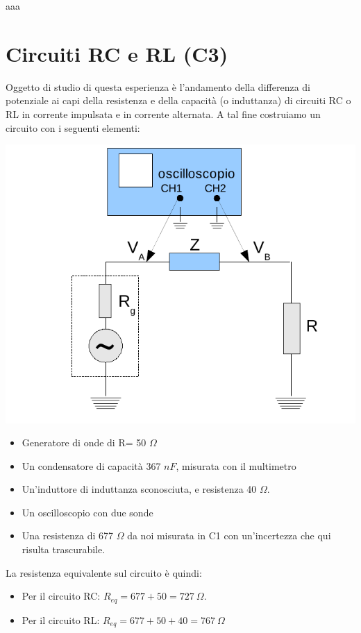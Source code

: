 aaa

\chapter{Circuiti RC e RL (C3)}

Oggetto di studio di questa esperienza è l'andamento della differenza di potenziale ai capi della resistenza e della capacità (o induttanza) di circuiti RC o RL in corrente impulsata e in corrente alternata.
A tal fine costruiamo un circuito con i seguenti elementi:

\begin{center}
 \includegraphics[scale=0.70]{grafici/C3/schema.png}
\end{center}

\begin{itemize}
  \item Generatore di onde di R= 50 $\Omega$
  \item Un condensatore di capacità 367 $nF$, misurata con il multimetro
  \item Un'induttore di induttanza sconosciuta, e resistenza 40 $\Omega$.
  \item Un oscilloscopio con due sonde
  \item Una resistenza di 677 $\Omega$ da noi misurata in C1 con un'incertezza che qui risulta trascurabile. 
\end{itemize}
La resistenza equivalente sul circuito è quindi:
\begin{itemize}
 \item Per il circuito RC: $R_{eq} = 677+50 = 727\ \Omega$.
 \item Per il circuito RL: $R_{eq} = 677+50+40 = 767\ \Omega$
\end{itemize}

